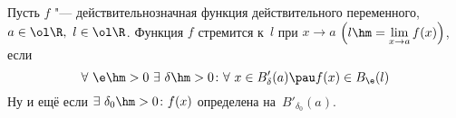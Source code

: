 
Пусть $f$ "--- действительнозначная функция действительного переменного, $a\in\ol\R,\ l\in\ol\R$. 
Функция $f$ стремится к~$l$ при $x\to a$ $\left(l\hm=\lim\limits_{x\to a}f(x)\right)$, если
$$    \forall\ \e\hm>0\ \exists\  \delta\hm>0\colon \forall\  x\in B'_\delta(a)\pau f(x)\in B_\e(l)$$
Ну и ещё если $\exists\  \delta_0\hm>0\colon f(x)$ определена на~$B'_{\delta_0}(a)$.

